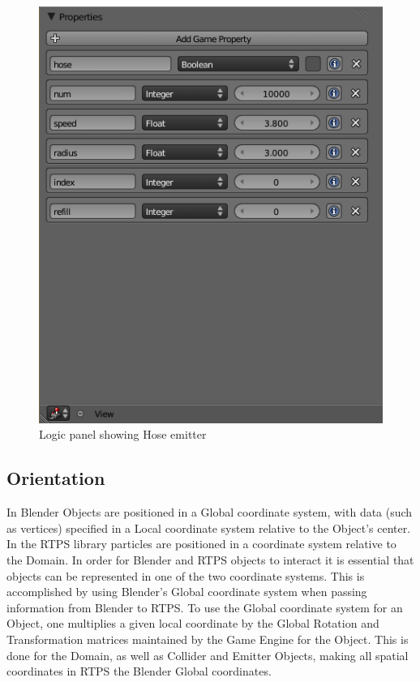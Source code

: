 \begin{figure}[!htc]
 		\centering
		\includegraphics[scale=0.6]{figures/ui_hose.png}
        \caption{ Logic panel showing Hose emitter }
		\label{fig:ui_hose}
\end{figure}
\clearpage

\subsection{Orientation}
In Blender Objects are positioned in a Global coordinate system, with data
(such as vertices) specified in a Local coordinate system relative to the
Object's center. In the RTPS library particles are positioned in a coordinate
system relative to the Domain. In order for Blender and RTPS objects to
interact it is essential that objects can be represented in one of the two
coordinate systems. This is accomplished by using Blender's Global coordinate
system when passing information from Blender to RTPS. To use the Global
coordinate system for an Object, one multiplies a given local coordinate by the
Global Rotation and Transformation matrices maintained by the Game Engine for
the Object. This is done for the Domain, as well as Collider and Emitter
Objects, making all spatial coordinates in RTPS the Blender Global coordinates.

